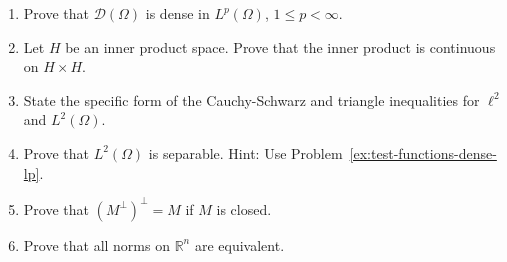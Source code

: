 \begin{enumerate}[label=\thesection.\arabic*.,ref=\thesection.\arabic*,start=1,series=book-problems]
\item\label{ex:test-functions-dense-lp} Prove that $\mathcal{D}(\Omega)$ is dense in $L^p(\Omega)$, $1\leq p<\infty$.

\item\label{ex:inner-product-joint-continuity} Let $H$ be an inner product space. Prove that the inner product is continuous on $H\times H$.

\item\label{ex:sequence-lp-two-cauchy-schwarz-triangle} State the specific form of the Cauchy-Schwarz and triangle inequalities for $\ell^2$ and $L^2(\Omega)$.

\item\label{ex:lp-two-separable} Prove that $L^2(\Omega)$ is separable. Hint: Use Problem~\ref{ex:test-functions-dense-lp}.

\item\label{ex:closed-subspace-double-orthogonal-complement} Prove that $(M^\perp)^\perp=M$ if $M$ is closed.

\item\label{ex:finite-dimensional-norms-equivalence} Prove that all norms on $\mathbb{R}^n$ are equivalent.

\end{enumerate}
